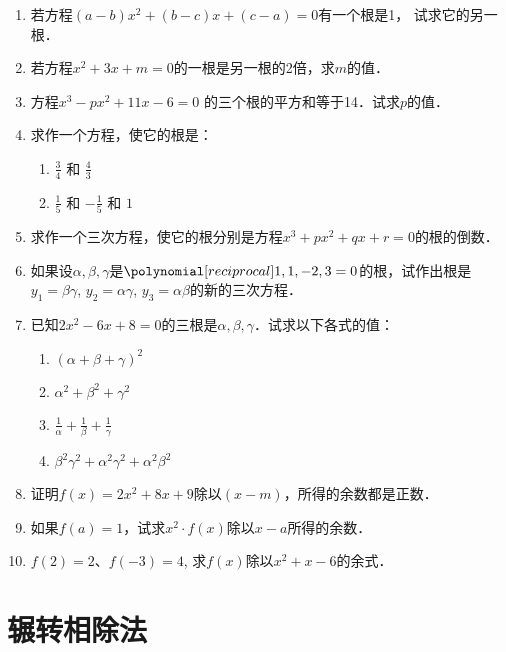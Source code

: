 \begin{enumerate}
\item 若方程$(a-b)x^2+(b-c)x+(c-a)=0$有一个根是1，
试求它的另一根．
\item 若方程$x^2+3x+m=0$的一根是另一根的2倍，求$m$的值．
\item 方程$x^3-px^2+11x-6=0$ 的三个根的平方和等于14．试求$p$的值．
\item 求作一个方程，使它的根是：
\begin{multicols}{2}
    \begin{enumerate}
    \item $\frac{3}{4}$ 和 $\frac{4}{3}$
    \item $\frac{1}{5}$ 和 $-\frac{1}{5}$ 和 $1$
\end{enumerate}
\end{multicols}

\item 求作一个三次方程，使它的根分别是方程$x^3+px^2+qx+r=0$的根的倒数．

\item 如果设$\alpha,\beta,
\gamma$是$\poly{1,1,-2,3}=0$的根，试作出根是
$y_1=\beta\gamma$, $y_2=\alpha\gamma$, $y_3=\alpha\beta$的新的三次方程．

\item 已知$2x^2-6x+8=0$的三根是$\alpha,\beta,
\gamma$．试求以下各式的值：
\begin{multicols}{2}
    \begin{enumerate}
    \item $(\alpha+\beta+\gamma)^2$ 
    \item $\alpha^2+\beta^2+\gamma^2$ 
    \item $\frac{1}{\alpha}+\frac{1}{\beta}+\frac{1}{\gamma}$
    \item $\beta^2\gamma^2+\alpha^2\gamma^2+\alpha^2\beta^2$
\end{enumerate}
\end{multicols}

\item 证明$f(x)=2x^2+8x+9$除以$(x-m)$，所得的余数都是正数．

\item 如果$f(a)=1$，试求$x^2\cdot f(x)$除以$x-a$所得的余数．

\item $f(2)=2$、$f(-3)=4$, 求$f(x)$除以$x^2+x-6$的余式．

\end{enumerate}


\section{辗转相除法}
